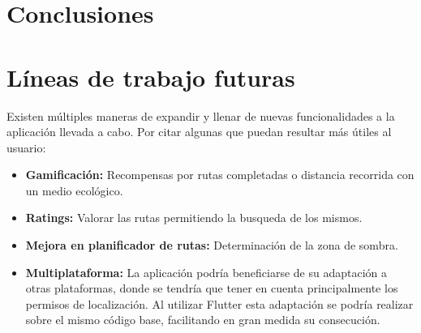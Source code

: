 \section*{Conclusiones}
\section*{Líneas de trabajo futuras}
Existen múltiples maneras de expandir y llenar de nuevas funcionalidades a la aplicación llevada a cabo.
Por citar algunas que puedan resultar más útiles al usuario:
\begin{itemize}
    \item \textbf{Gamificación:} Recompensas por rutas completadas o distancia recorrida con un medio ecológico.
    \item \textbf{Ratings:} Valorar las rutas permitiendo la busqueda de los mismos.
    \item \textbf{Mejora en planificador de rutas:} Determinación de la zona de sombra.
    \item \textbf{Multiplataforma:} La aplicación podría beneficiarse de su adaptación a otras plataformas, donde se tendría que tener en cuenta principalmente los permisos de localización. Al utilizar Flutter esta adaptación se podría realizar sobre el mismo código base, facilitando en gran medida su consecución.
\end{itemize}